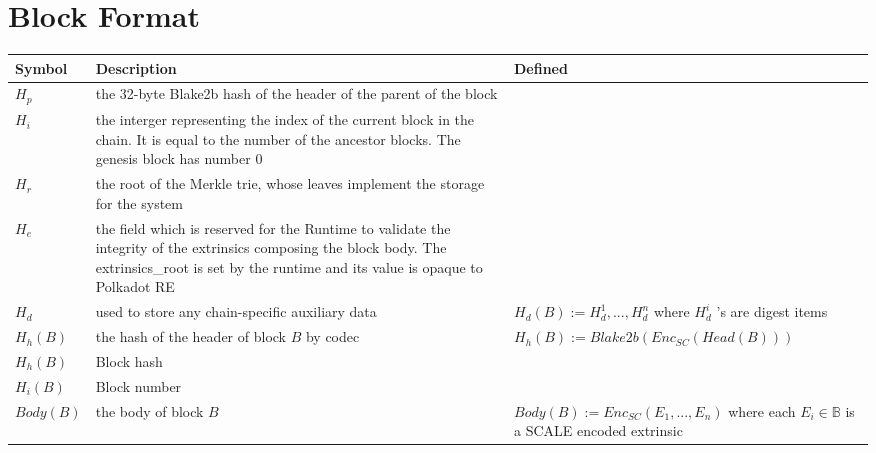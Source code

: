 \documentclass[11pt,a4paper]{article}
\begin{document}
\section*{Block Format}
\begin{center}
 \begin{tabulary}{1.0\textwidth}{LLL}
  \textbf{Symbol} & \textbf{Description} & \textbf{Defined} \\
  \hline
\(H_p\) &the 32-byte Blake2b hash of the header of the parent of the block&\\
\(H_i\) &the interger representing the index of the current block in the chain. It is equal to the number of the ancestor blocks. The genesis block has number 0&\\
\(H_r\) &the root of the Merkle trie, whose leaves implement the storage for the system&\\
\(H_e\) &the field which is reserved for the Runtime to validate the integrity of the extrinsics composing the block body. The extrinsics\_root is set by the runtime and its value is opaque to Polkadot RE&\\
\(H_d\) &used to store any chain-specific auxiliary data& \(H_d(B):=H^1_d,...,H^n_d\) where \(H^i_d\) 's are digest items\\
\(H_h(B)\) &the hash of the header of block \(B\) by codec& \(H_h(B):=Blake2b(Enc_{SC}(Head(B)))\) \\
\(H_h(B)\) &Block hash&\\
\(H_i(B)\) &Block number&\\
\(Body(B)\) &the body of block \(B\) & \(Body(B):=Enc_{SC}(E_1,...,E_n)\) where each \(E_i \in \mathbb B\) is a SCALE encoded extrinsic\\
 \end{tabulary}
\end{center}
\end{document}
